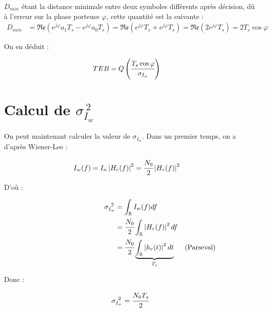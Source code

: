 \documentclass[11pt,a4paper]{report}
\begin{document}
$D_{min}$ étant la distance minimale entre deux symboles différents après décision, dû à l'erreur sur la phase porteuse $\varphi$, cette quantité est la suivante :
\begin{align*}
    D_{min} & = \mathfrak{Re}\displaystyle\left( e^{j\varphi} a_1 T_s - e^{j\varphi} a_0 T_s \right) = \mathfrak{Re}\displaystyle\left( e^{j\varphi}T_s + e^{j\varphi}T_s \right) = \mathfrak{Re}\displaystyle\left( 2e^{j\varphi}T_s \right) = 2T_s\cos\varphi 
\end{align*}

On en déduit :

\begin{align*}
    TEB & = Q\displaystyle\left(\cfrac{T_s\cos\varphi}{\sigma_{I_w}}\right)
\end{align*}

\vspace{0.5cm}

\section{Calcul de $\sigma_{I_w}^{~2}$}

On peut maintenant calculer la valeur de $\sigma_{I_w}$. Dans un premier temps, on a d'après Wiener-Lee :

\begin{align*}
    I_w(f) & = I_n \displaystyle\left\lvert H_r(f) \right\rvert^2 = \cfrac{N_0}{2}\displaystyle\left\lvert H_r(f) \right\rvert^2
\end{align*}

D'où :

\begin{align*}
    \hspace{3cm} \sigma_{I_w}^{~2} & = \displaystyle \int_{\mathbb{R}}I_w(f)df & \\
    & = \cfrac{N_0}{2} \displaystyle \int_{\mathbb{R}} \displaystyle\left\lvert H_r(f) \right\rvert^2 df & \\
    & = \cfrac{N_0}{2} \underbrace{\displaystyle\int_{\mathbb{R}} \displaystyle\left\lvert h_r(t) \right\rvert^2 dt}_{T_s} & \text{(Parseval)}
\end{align*}

Donc :

\begin{align*}
    \sigma_{I_w}^{~2} = \cfrac{N_0T_s}{2}
\end{align*}

\vspace{0.5cm}
\end{document}

